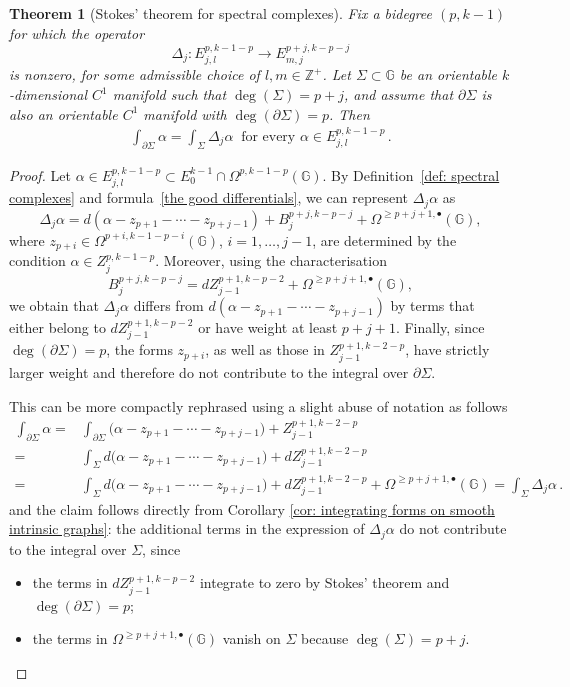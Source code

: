 \documentclass[dvipsnames]{amsart}
\newtheorem{theorem}{Theorem}[section]
\theoremstyle{definition}
\theoremstyle{definition}
\numberwithin{equation}{section}
\newcommand{\G}{\mathbb{G}}
\begin{document}
\begin{theorem}[Stokes' theorem for spectral complexes]\label{thm: stokes for spectral complexes} Fix a bidegree $(p,k-1)$ for which the operator $$\Delta_j\colon E_{j,l}^{p,k-1-p}\longrightarrow E_{m,j}^{p+j,k-p-j}$$
is nonzero, for some admissible choice of $l,m\in\mathbb{Z}^+$. Let $\Sigma\subset\mathbb{G}$ be an orientable $k$-dimensional $C^1$ manifold such that $\operatorname{deg}(\Sigma)=p+j$, and assume that $\partial\Sigma$ is also an orientable $C^1$ manifold with $\operatorname{deg}(\partial\Sigma)=p$. Then
\begin{align*}
    \int_{\partial\Sigma}\alpha=\int_\Sigma \Delta_j\alpha\ \text{ for every }\alpha\in E_{j,l}^{p,k-1-p}\,.
\end{align*}
\end{theorem}
\begin{proof}
Let $\alpha\in E_{j,l}^{p,k-1-p}\subset E_0^{k-1}\cap\Omega^{p,k-1-p}(\mathbb G)$.
By Definition~\ref{def: spectral complexes} and formula~\eqref{the good differentials}, we can represent $\Delta_j\alpha$ as
\[
\Delta_j\alpha
=
d(\alpha - z_{p+1} - \cdots - z_{p+j-1})
+
B_j^{p+j,k-p-j}
+
\Omega^{\ge p+j+1,\bullet}(\mathbb G),
\]
where $z_{p+i}\in \Omega^{p+i,k-1-p-i}(\mathbb G)$, $i=1,\ldots,j-1$,
are determined by the condition $\alpha\in Z_j^{p,k-1-p}$. Moreover, using the characterisation
\[
B_j^{p+j,k-p-j}
=
dZ_{j-1}^{p+1,k-p-2}
+
\Omega^{\ge p+j+1,\bullet}(\mathbb G),
\]
we obtain that $\Delta_j\alpha$ differs from $d(\alpha - z_{p+1} - \cdots - z_{p+j-1})$
by terms that either belong to $dZ_{j-1}^{p+1,k-p-2}$ or have weight at least $p+j+1$. Finally, since $\deg(\partial\Sigma)=p$, the forms $z_{p+i}$, as well as those in $Z^{p+1,k-2-p}_{j-1}$, have strictly larger weight and therefore do not contribute to the integral over $\partial\Sigma$. 

 This can be more compactly rephrased using a slight abuse of notation as follows
    \begin{align*}
        \int_{\partial\Sigma}\alpha=&\int_{\partial\Sigma}\big(\alpha-z_{p+1}-\cdots-z_{p+j-1}\big)+Z_{j-1}^{p+1,k-2-p}\\=&\int_\Sigma d\big(\alpha-z_{p+1}-\cdots-z_{p+j-1}\big)+dZ_{j-1}^{p+1,k-2-p}\\=&\int_\Sigma d\big(\alpha-z_{p+1}-\cdots-z_{p+j-1}\big)+dZ_{j-1}^{p+1,k-2-p}+\Omega^{\ge p+j+1,\bullet}(\G)=\int_\Sigma \Delta_j\alpha\,.
    \end{align*}
    and the claim follows directly from Corollary \ref{cor: integrating forms on smooth intrinsic graphs}: the additional terms in the expression of $\Delta_j\alpha$ do not contribute to the integral over $\Sigma$, since
\begin{itemize}
\item the terms in $dZ_{j-1}^{p+1,k-p-2}$ integrate to zero by Stokes' theorem and  $\operatorname{deg}(\partial\Sigma)=p$;
\item the terms in $\Omega^{\ge p+j+1,\bullet}(\mathbb G)$ vanish on $\Sigma$ because $\deg(\Sigma)=p+j$.
\end{itemize}

\end{proof}
\end{document}
